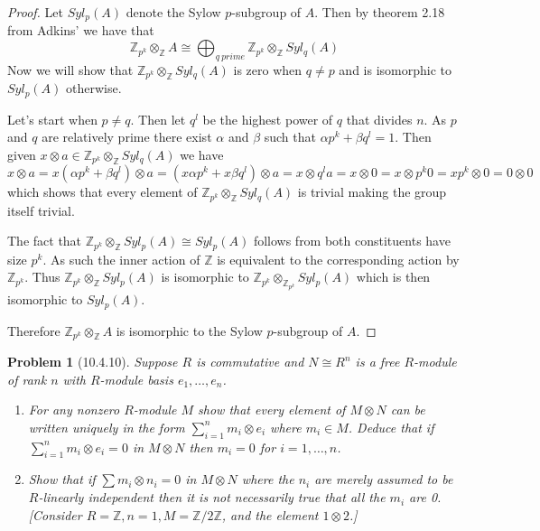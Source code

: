 \documentclass[10pt]{article}
\newcommand{\sk}{\vskip 10mm}
\newcommand{\bb}[1]{\mathbb{#1}}
\theoremstyle{plain}
\newtheorem{problem}{Problem}
\theoremstyle{remark}
\begin{document}
\begin{proof}
  Let $Syl_p(A)$ denote the Sylow $p$-subgroup of $A$. Then by theorem
  2.18 from Adkins' we have that
  \[
    \bb{Z}_{p^k}\otimes_{\bb{Z}} A \cong \bigoplus_{q\ prime}\bb{Z}_{p^k}\otimes_{\bb{Z}} Syl_q(A)
  \]
  Now we will show that $\bb{Z}_{p^k}\otimes_{\bb{Z}}Syl_q(A)$ is zero when
  $q\neq p$ and is isomorphic to $Syl_p(A)$ otherwise.

  Let's start when $p\neq q$. Then let $q^l$ be the highest power of
  $q$ that divides $n$. As $p$ and $q$ are relatively prime there
  exist $\alpha$ and $\beta$ such that $\alpha p^k+\beta q^l=1$. Then given
  $x\otimes a\in \bb{Z}_{p^k}\otimes_{\bb{Z}} Syl_q(A)$ we have
  \[
    x\otimes a = x(\alpha p^k+\beta q^l)\otimes a = (x\alpha p^k+x\beta q^l)\otimes a = x\otimes q^l a= x\otimes 0 = x \otimes p^k0 = x p^k\otimes 0 = 0\otimes 0
  \]
  which shows that every element of $\bb{Z}_{p^k}\otimes_{\bb{Z}} Syl_q(A)$ is
  trivial making the group itself trivial.

  The fact that $\bb{Z}_{p^k}\otimes_{\bb{Z}} Syl_p(A)\cong Syl_p(A)$ follows from
  both constituents have size $p^k$. As such the inner action of $\bb{Z}$
  is equivalent to the corresponding action by $\bb{Z}_{p^k}$. Thus
  $\bb{Z}_{p^k}\otimes_{\bb{Z}} Syl_p(A)$ is isomorphic to
  $\bb{Z}_{p^k}\otimes_{\bb{Z}_{p^k}} Syl_p(A)$ which is then isomorphic to $Syl_p(A)$.

  Therefore $\bb{Z}_{p^k}\otimes_{\bb{Z}} A$ is isomorphic to the Sylow $p$-subgroup of $A$.
\end{proof}

\sk

\begin{problem}[10.4.10]
  Suppose $R$ is commutative and $N\cong R^n$ is a free $R$-module of rank
  $n$ with $R$-module basis $e_1,\ldots,e_n$.
  \begin{enumerate}
  \item[(a)] For any nonzero $R$-module $M$ show that every element
    of $M\otimes N$ can be written uniquely in the form
    $\sum_{i=1}^n m_i\otimes e_i$ where $m_i\in M$. Deduce that if
    $\sum_{i=1}^nm_i\otimes e_i=0$ in $M\otimes N$ then $m_i=0$ for
    $i=1,\ldots,n$.
  \item[(b)] Show that if $\sum m_i\otimes n_i=0$ in $M\otimes N$ where the
    $n_i$ are merely assumed to be $R$-linearly independent then it is not
    necessarily true that all the $m_i$ are 0. [Consider
    $R=\bb{Z},n=1,M=\bb{Z}/2\bb{Z}$, and the element $1\otimes 2$.]
  \end{enumerate}
\end{problem}
\end{document}
